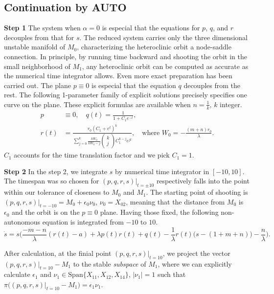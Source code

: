 \documentclass[a4paper,11pt]{article}
\theoremstyle{remark}
\begin{document}
\subsection{Continuation by AUTO}
{\bf \noindent Step 1}
The system when $\alpha=0$ is especial that the equations for $p$, $q$, and $r$ decouples from that for $s$. The reduced system carries only the three dimensional unstable manifold of $M_0$, characterizing the heteroclinic orbit a node-saddle connection. In principle, by running time backward and shooting the orbit in the small neighborhood of $M_1$, any heteroclinic orbit can be computed as accurate as the numerical time integrator allows. Even more exact preparation has been carried out. The plane $p\equiv0$ is especial that the equation $q$ decouples from the rest. The following 1-parameter family of explicit solutions precisely specifies one curve on the plane. These explicit formulas are available when $n= \frac{1}{k}$, $k$ integer.
\begin{align}
 p&\equiv0, \quad q(t) = \frac{1}{1+C_1e^{-t}},\\
 r(t) &= \frac{r_0 \left(C_1 + e^t\right)^k}{ \displaystyle \sum_{j=0}^k \frac{kW_0}{kW_0 -j}\begin{pmatrix} k\\j\end{pmatrix}C_1^{k-j} e^{jt}} , \quad \text{where $W_0= - \frac{(m+n)r_0}{\lambda}$}.
\end{align}
$C_1$ accounts for the time translation factor and we pick $C_1=1$.

{\bf \noindent Step 2}
In the step 2, we integrate $s$ by numerical time integrator in $[-10,10]$. The timespan was so chosen for $(p,q,r,s)|_{t=\pm10}$ respectively falls into the point within our tolerance of closeness to $M_0$ and $M_1$. The starting point of shooting is $(p,q,r,s)|_{t=-10} = M_0 + \epsilon_0 \nu_0$, $\nu_0 = X_{02}$, meaning that the distance from $M_0$ is $\epsilon_0$ and the orbit is on the $p\equiv0$ plane. Having those fixed, the following non-autonomous equation is integrated from $-10$ to $10$.
$$\dot{s} =s\Big(\frac{-m-n}{\lambda}(r(t)-a) + \lambda p(t)r(t) + q(t) - \frac{1}{\lambda}r(t)\big(s- (1+m+n)\big) - \frac{n}{\lambda}\Big).$$

After calculation, at the finial point $(p,q,r,s)|_{t=10}$, we project the vector $(p,q,r,s)|_{t=10}- M_1$ to the stable {\it subspace} of $M_1$, where we can explicitly calculate $\epsilon_1$ and $\nu_1 \in \underset{}{ \textrm{Span}}\{X_{11},X_{12},X_{14}\}$, $|\nu_1|=1$ such that
$\pi\big((p,q,r,s)|_{t=10}- M_1\big) =\epsilon_1 \nu_1$.
\end{document}
